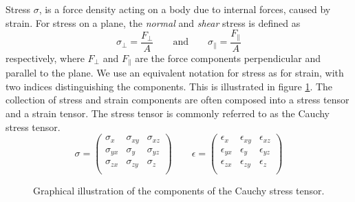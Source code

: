 \documentclass[twoside,english]{uiofysmaster}
\begin{document}
Stress $\sigma$, is a force density acting on a body due to internal forces, caused by strain.
For stress on a plane, the \textit{normal} and \textit{shear} stress is defined as
\begin{equation}
\sigma_\perp = \frac{F_\perp}{A} \qquad \text{and} \qquad \sigma_\parallel = \frac{F_\parallel}{A}
\end{equation}
respectively, where $F_\perp$ and $F_\parallel$ are the force components perpendicular and parallel to the plane.
We use an equivalent notation for stress as for strain, with two indices distinguishing the components.
This is illustrated in figure \ref{fig:stressTensor}.
The collection of stress and strain components are often composed into a stress tensor and a strain tensor. 
The stress tensor is commonly referred to as the Cauchy stress tensor.
\begin{equation}
\sigma = 
\begin{pmatrix}
\sigma_{x} & \sigma_{xy} & \sigma_{xz} \\
\sigma_{yx} & \sigma_{y} & \sigma_{yz} \\
\sigma_{zx} & \sigma_{zy} & \sigma_{z} \\
\end{pmatrix}
\qquad
\epsilon = 
\begin{pmatrix}
\epsilon_{x} & \epsilon_{xy} & \epsilon_{xz} \\
\epsilon_{yx} & \epsilon_{y} & \epsilon_{yz} \\
\epsilon_{zx} & \epsilon_{zy} & \epsilon_{z} \\
\end{pmatrix}
\end{equation}

\begin{figure}
	\center
	\resizebox{0.5\linewidth}{!}{
		
	}
	\caption{Graphical illustration of the components of the Cauchy stress tensor.}
	\label{fig:stressTensor}
\end{figure}
\end{document}
